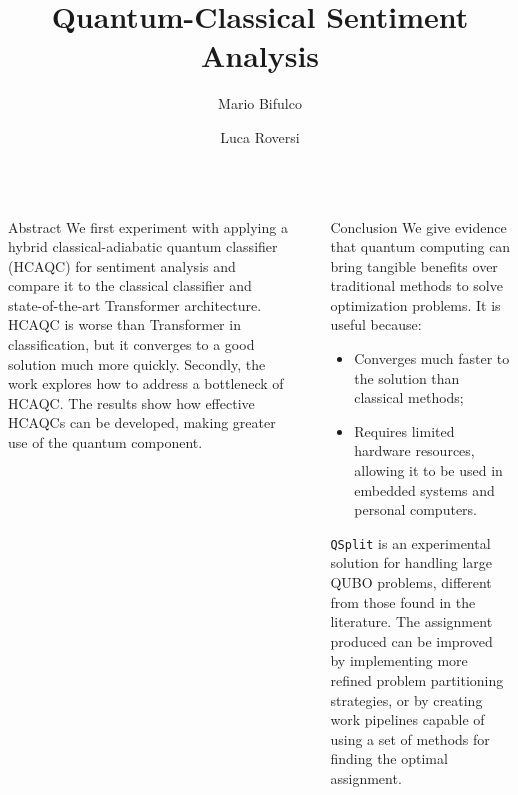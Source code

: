 \documentclass[final]{beamer}
\title{Quantum-Classical Sentiment Analysis}
\author{Mario Bifulco\inst{1} \and Luca Roversi\inst{1}}
\institute[shortinst]{\inst{1} University of Turin, Computer Science Department}
\newlength{\sepwidth}
\newlength{\colwidth}
\newcommand{\separatorcolumn}{\begin{column}{\sepwidth}\end{column}}
\begin{document}
\begin{frame}[t,fragile]
\begin{columns}[t]

\begin{column}{\colwidth}
  \begin{block}{Abstract}
    We first experiment with applying a hybrid classical-adiabatic quantum classifier (HCAQC) for sentiment analysis and compare it to the classical classifier and state-of-the-art Transformer architecture. 
    HCAQC is worse than Transformer in classification, but it converges to a good solution much more quickly. 
    Secondly, the work explores how to address a bottleneck of HCAQC. 
    The results show how effective HCAQCs can be developed, making greater use of the quantum component.
  \end{block}

  

  

  
\end{column}

\separatorcolumn

\begin{column}{\colwidth}
  

  

  \begin{block}{Conclusion}
    We give evidence that quantum computing can bring tangible benefits over traditional methods to solve optimization problems.
    It is useful because:
    \begin{itemize}
      \item Converges much faster to the solution than classical methods;
      \item Requires limited hardware resources, allowing it to be used in embedded systems and personal computers.
    \end{itemize} 

    \texttt{QSplit} is an experimental solution for handling large QUBO problems, different from those found in the literature\cite{subqubo2}. 
    The assignment produced can be improved by implementing more refined problem partitioning strategies\cite{bnb}, or by creating work pipelines capable of using a set of methods for finding the optimal assignment\cite{dwavehybrid}.
  \end{block}


\end{column}
\end{columns}
\end{frame}
\end{document}
